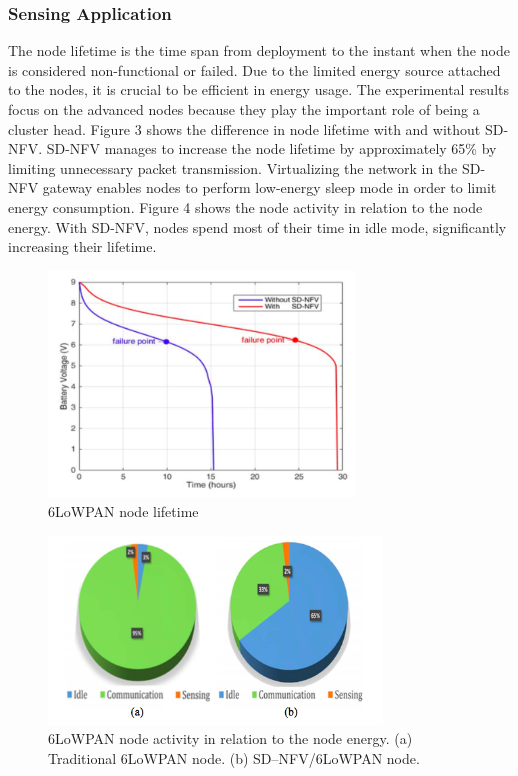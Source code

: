 \documentclass[10pt,journal,compsoc]{IEEEtran}
\begin{document}
\subsubsection{Sensing Application}

The node lifetime is the time span from deployment to the instant when 
the node is considered non-functional or failed. Due to the limited 
energy source attached to the nodes, it is crucial to be efficient 
in energy usage. The experimental results focus on the advanced nodes 
because they play the important role of being a cluster head. Figure 3 
\cite{main} shows the difference in node lifetime with and without SD-NFV. 
SD-NFV manages to increase the node lifetime by approximately 65\% 
by limiting unnecessary packet transmission. Virtualizing the network 
in the SD-NFV gateway enables nodes to perform low-energy sleep mode in 
order to limit energy consumption. Figure 4 \cite{main} shows the 
node activity in relation to the node energy. With SD-NFV, nodes spend 
most of their time in idle mode, significantly increasing their lifetime.

\begin{figure}
    \includegraphics[height=60mm]{node_lifetime}
    \caption{6LoWPAN node lifetime}
\end{figure}

\begin{figure}
    \includegraphics[height=50mm]{node_activity}
    \caption{6LoWPAN node activity in relation to the node energy. 
    (a) Traditional 6LoWPAN node. (b) SD–NFV/6LoWPAN node.}
\end{figure}
\end{document}
